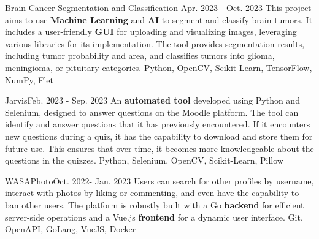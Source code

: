 
\begin{projects}
	\project
	{Brain Cancer Segmentation and Classification}{ Apr. 2023 - Oct. 2023}
	{ }
	{This project aims to use \textbf{Machine Learning} and \textbf{AI} to segment and classify brain tumors. 
	It includes a user-friendly \textbf{GUI} for uploading and visualizing images, leveraging various libraries for its
	implementation. The tool provides segmentation results, including tumor probability and area, and classifies 
	tumors into glioma, meningioma, or pituitary categories.}
	{Python, OpenCV, Scikit-Learn, TensorFlow, NumPy, Flet}
				
	\project
	{Jarvis}{Feb. 2023 - Sep. 2023}
	{}
	{An \textbf{automated tool} developed using Python and Selenium, designed to answer questions on the Moodle platform. 
	The tool can identify and answer questions that it has previously encountered. If it encounters new questions during a 
	quiz, it has the capability to download and store them for future use. This ensures that over time, it becomes more 
	knowledgeable about the questions in the quizzes.}
	{Python, Selenium, OpenCV, Scikit-Learn, Pillow}

	\project
	{WASAPhoto}{Oct. 2022- Jan. 2023}
	{}
	{Users can search for other profiles by username, interact with photos by 
	liking or commenting, and even have the capability to ban other users. The platform is robustly built with a Go
	\textbf{backend} for efficient server-side operations and a Vue.js \textbf{frontend} for a dynamic user interface.}
	{Git, OpenAPI, GoLang, VueJS, Docker}
\end{projects}